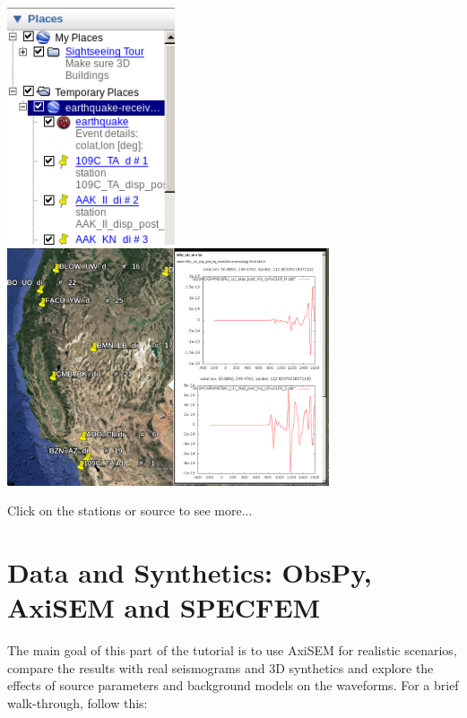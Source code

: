 \documentclass{article}
\begin{document}
\begin{enumerate}
    \begin{center}
    \includegraphics[height=70mm]{google-earth.png}
    \hspace{5mm}
    \includegraphics[height=70mm]{google-earth2.png}
    \end{center}

    Click on the stations or source to see more...

\end{enumerate}



\newpage

\section{Data and Synthetics: ObsPy, AxiSEM and SPECFEM}
The main goal of this part of the tutorial is to use AxiSEM for realistic scenarios, 
compare the results with real seismograms and 3D synthetics and 
explore the effects of source parameters and background models on the waveforms. 
For a brief walk-through, follow this: \\
\end{document}
